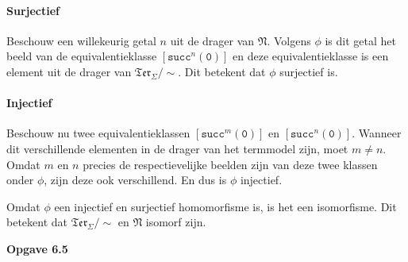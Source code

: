 \documentclass[a4paper,11pt]{article}
\begin{document}
\begin{enumerate}
\paragraph{Surjectief}

Beschouw een willekeurig getal $n$ uit de drager van $\mathfrak{N}$. Volgens
$\phi$ is dit getal het beeld van de equivalentieklasse
$[\texttt{succ}^{n}(\texttt{0})]$ en deze equivalentieklasse is een element
uit de drager van $\mathfrak{Ter}_{\Sigma}/\sim$. Dit betekent dat $\phi$
surjectief is.

\paragraph{Injectief}

Beschouw nu twee equivalentieklassen $[\texttt{succ}^{m}(\texttt{0})]$ en
$[\texttt{succ}^{n}(\texttt{0})]$. Wanneer dit verschillende elementen in de
drager van het termmodel zijn, moet $m \neq n$. Omdat $m$ en $n$ precies de
respectievelijke beelden zijn van deze twee klassen onder $\phi$, zijn deze
ook verschillend. En dus is $\phi$ injectief.

Omdat $\phi$ een injectief en surjectief homomorfisme is, is het een
isomorfisme. Dit betekent dat $\mathfrak{Ter}_{\Sigma}/\sim$ en $\mathfrak{N}$
isomorf zijn.\\[2em]

\end{enumerate}


{\bf Opgave 6.5}
\end{document}
